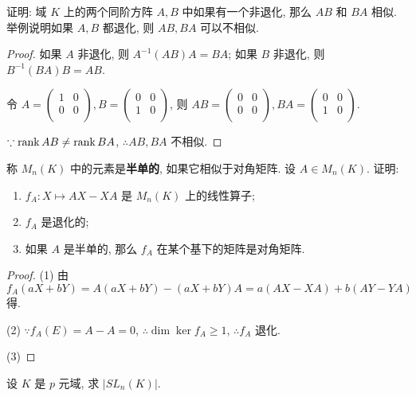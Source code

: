\documentclass[color=black,device=normal,lang=cn,mode=geye]{elegantnote}
\begin{document}
\begin{exercisec}[2.2.8]
    证明: 域 $K$ 上的两个同阶方阵 $A,B$ 中如果有一个非退化, 那么 $AB$ 和 $BA$ 相似. 举例说明如果 $A,B$ 都退化, 则 $AB,BA$ 可以不相似.
\end{exercisec}
\begin{proof}
    如果 $A$ 非退化, 则 $A^{-1}(AB)A=BA$; 如果 $B$ 非退化, 则 $B^{-1}(BA)B=AB$.

    令 $A=\begin{pmatrix}
        1 & 0 \\
        0 & 0 \\
    \end{pmatrix},B=\begin{pmatrix}
        0 & 0 \\
        1 & 0 \\
    \end{pmatrix}$, 则 $AB=\begin{pmatrix}
        0 & 0 \\
        0 & 0 \\
    \end{pmatrix},BA=\begin{pmatrix}
        0 & 0 \\
        1 & 0 \\
    \end{pmatrix}$.
    
    $\because\operatorname{rank} AB\neq\operatorname{rank} BA$, $\therefore AB,BA$ 不相似.
\end{proof}
\begin{exercisec}[2.2.9]
    称 $M_n(K)$ 中的元素是\textbf{半单的}, 如果它相似于对角矩阵. 设 $A\in M_n(K)$. 证明:
    \begin{enumerate}
        \def\labelenumi{(\arabic{enumi})}
        \item $f_A:X\mapsto AX-XA$ 是 $M_n(K)$ 上的线性算子;
        \item $f_A$ 是退化的;
        \item 如果 $A$ 是半单的, 那么 $f_A$ 在某个基下的矩阵是对角矩阵.
    \end{enumerate}
\end{exercisec}
\begin{proof}
    (1) 由
    \[f_A(aX+bY)=A(aX+bY)-(aX+bY)A=a(AX-XA)+b(AY-YA)\]
    得.

    (2) $\because f_A(E)=A-A=0$, $\therefore\dim\ker f_A\geq1$, $\therefore f_A$ 退化.

    (3)
\end{proof}
\begin{exercisec}[2.2.12]
    设 $K$ 是 $p$ 元域, 求 $|SL_n(K)|$.
\end{exercisec}
\end{document}
